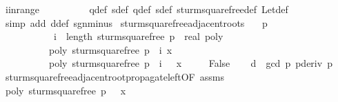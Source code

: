 \begin{isabellebody}
\ i{\isacharunderscore}in{\isacharunderscore}range\isanewline
\ \ \ \ \ \ \ \ \isamarkupfalse%
\ q{\isacharprime}{\isacharunderscore}def\ s{\isacharprime}{\isacharunderscore}def\ q{\isacharunderscore}def\ s{\isacharunderscore}def\ sturm{\isacharunderscore}squarefree{\isacharprime}{\isacharunderscore}def\ Let{\isacharunderscore}def\isanewline
\ \ \ \ \ \ \ \ \isamarkupfalse%
\ {\isacharparenleft}simp\ add{\isacharcolon}\ d{\isacharunderscore}def\ sgn{\isacharunderscore}minus{\isacharparenright}\isanewline
{}\isamarkupfalse%
%
\endisatagproof
{\isafoldproof}%
%
\isadelimproof
\isanewline
%
\endisadelimproof
\isanewline
{}\isamarkupfalse%
\ sturm{\isacharunderscore}squarefree{\isacharprime}{\isacharunderscore}adjacent{\isacharunderscore}roots{\isacharcolon}\isanewline
\ \ \ {\isachardoublequoteopen}p\ {\isasymnoteq}\ {}{\isachardoublequoteclose}\isanewline
\ \ \ \ \ \ \ \ \ \ \ {\isachardoublequoteopen}i\ {\isacharless}\ length\ {\isacharparenleft}sturm{\isacharunderscore}squarefree{\isacharprime}\ {\isacharparenleft}p\ {\isacharcolon}{\isacharcolon}\ real\ poly{\isacharparenright}{\isacharparenright}\ {\isacharminus}\ {}{\isachardoublequoteclose}\isanewline
\ \ \ \ \ \ \ \ \ \ {\isachardoublequoteopen}poly\ {\isacharparenleft}sturm{\isacharunderscore}squarefree{\isacharprime}\ p\ {\isacharbang}\ i{\isacharparenright}\ x\ {\isacharequal}\ {}{\isachardoublequoteclose}\ \isanewline
\ \ \ \ \ \ \ \ \ \ {\isachardoublequoteopen}poly\ {\isacharparenleft}sturm{\isacharunderscore}squarefree{\isacharprime}\ p\ {\isacharbang}\ {\isacharparenleft}i\ {\isacharplus}\ {}{\isacharparenright}{\isacharparenright}\ x\ {\isacharequal}\ {}{\isachardoublequoteclose}\isanewline
\ \ \ False\isanewline
%
\isadelimproof
%
\endisadelimproof
%
\isatagproof
{}\isamarkupfalse%
{\isacharminus}\isanewline
\ \ \isamarkupfalse%
\ d\ {\isasymequiv}\ {\isachardoublequoteopen}gcd\ p\ {\isacharparenleft}pderiv\ p{\isacharparenright}{\isachardoublequoteclose}\isanewline
\ \ \isamarkupfalse%
\ sturm{\isacharunderscore}squarefree{\isacharprime}{\isacharunderscore}adjacent{\isacharunderscore}root{\isacharunderscore}propagate{\isacharunderscore}left{\isacharbrackleft}OF\ assms{\isacharbrackright}\isanewline
\ \ \ \ \ \ \isamarkupfalse%
\ {\isachardoublequoteopen}poly\ {\isacharparenleft}sturm{\isacharunderscore}squarefree{\isacharprime}\ p\ {\isacharbang}\ {}{\isacharparenright}\ x\ {\isacharequal}\ {}{\isachardoublequoteclose}\ \isanewline

\end{isabellebody}
